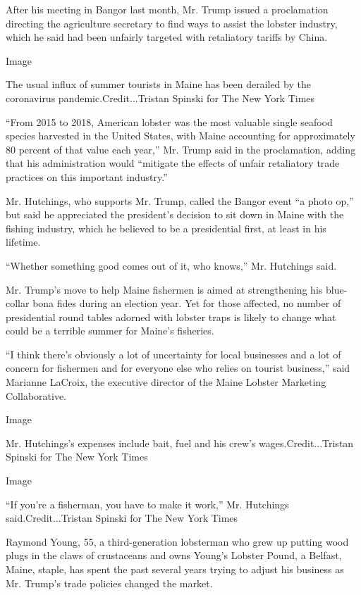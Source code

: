 After his meeting in Bangor last month, Mr. Trump issued a proclamation
directing the agriculture secretary to find ways to assist the lobster
industry, which he said had been unfairly targeted with retaliatory
tariffs by China.

Image

The usual influx of summer tourists in Maine has been derailed by the
coronavirus pandemic.Credit...Tristan Spinski for The New York Times

``From 2015 to 2018, American lobster was the most valuable single
seafood species harvested in the United States, with Maine accounting
for approximately 80 percent of that value each year,'' Mr. Trump said
in the proclamation, adding that his administration would ``mitigate the
effects of unfair retaliatory trade practices on this important
industry.''

Mr. Hutchings, who supports Mr. Trump, called the Bangor event ``a photo
op,'' but said he appreciated the president's decision to sit down in
Maine with the fishing industry, which he believed to be a presidential
first, at least in his lifetime.

``Whether something good comes out of it, who knows,'' Mr. Hutchings
said.

Mr. Trump's move to help Maine fishermen is aimed at strengthening his
blue-collar bona fides during an election year. Yet for those affected,
no number of presidential round tables adorned with lobster traps is
likely to change what could be a terrible summer for Maine's fisheries.

``I think there's obviously a lot of uncertainty for local businesses
and a lot of concern for fishermen and for everyone else who relies on
tourist business,'' said Marianne LaCroix, the executive director of the
Maine Lobster Marketing Collaborative.

Image

Mr. Hutchings's expenses include bait, fuel and his crew's
wages.Credit...Tristan Spinski for The New York Times

Image

``If you're a fisherman, you have to make it work,'' Mr. Hutchings
said.Credit...Tristan Spinski for The New York Times

Raymond Young, 55, a third-generation lobsterman who grew up putting
wood plugs in the claws of crustaceans and owns Young's Lobster Pound, a
Belfast, Maine, staple, has spent the past several years trying to
adjust his business as Mr. Trump's trade policies changed the market.


